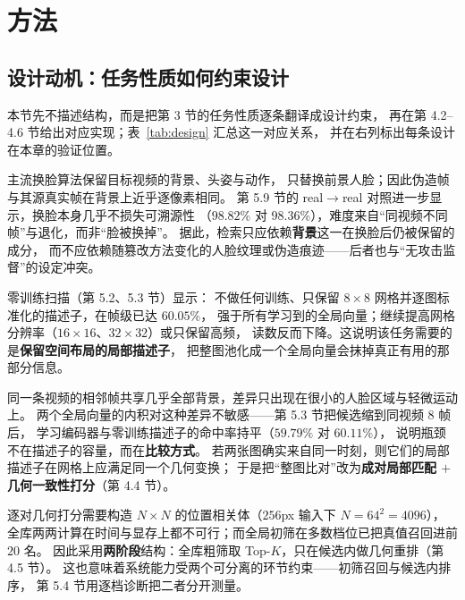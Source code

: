 \section{方法}
\label{sec:method}

\subsection{设计动机：任务性质如何约束设计}
\label{sec:design}

本节先不描述结构，而是把第 3 节的任务性质逐条翻译成设计约束，
再在第 4.2--4.6 节给出对应实现；表~\ref{tab:design} 汇总这一对应关系，
并在右列标出每条设计在本章的验证位置。

主流换脸算法保留目标视频的背景、头姿与动作，
只替换前景人脸；因此伪造帧与其源真实帧在背景上近乎逐像素相同。
第 5.9 节的 real$\rightarrow$real 对照进一步显示，换脸本身几乎不损失可溯源性
（$98.82\%$ 对 $98.36\%$），难度来自“同视频不同帧”与退化，而非“脸被换掉”。
据此，检索只应依赖\textbf{背景}这一在换脸后仍被保留的成分，
而不应依赖随篡改方法变化的人脸纹理或伪造痕迹——后者也与“无攻击监督”的设定冲突。

零训练扫描（第 5.2、5.3 节）显示：
不做任何训练、只保留 $8\times8$ 网格并逐图标准化的描述子，在帧级已达 $60.05\%$，
强于所有学习到的全局向量；继续提高网格分辨率（$16\times16$、$32\times32$）或只保留高频，
读数反而下降。这说明该任务需要的是\textbf{保留空间布局的局部描述子}，
把整图池化成一个全局向量会抹掉真正有用的那部分信息。

同一条视频的相邻帧共享几乎全部背景，差异只出现在很小的人脸区域与轻微运动上。
两个全局向量的内积对这种差异不敏感——第 5.3 节把候选缩到同视频 $8$ 帧后，
学习编码器与零训练描述子的命中率持平（$59.79\%$ 对 $60.11\%$），
说明瓶颈不在描述子的容量，而在\textbf{比较方式}。
若两张图确实来自同一时刻，则它们的局部描述子在网格上应满足同一个几何变换；
于是把“整图比对”改为\textbf{成对局部匹配 $+$ 几何一致性打分}（第 4.4 节）。

逐对几何打分需要构造 $N\times N$ 的位置相关体（$256$px 输入下 $N=64^2=4096$），
全库两两计算在时间与显存上都不可行；而全局初筛在多数档位已把真值召回进前 $20$ 名。
因此采用\textbf{两阶段}结构：全库粗筛取 Top-$K$，只在候选内做几何重排（第 4.5 节）。
这也意味着系统能力受两个可分离的环节约束——初筛召回与候选内排序，
第 5.4 节用逐档诊断把二者分开测量。

